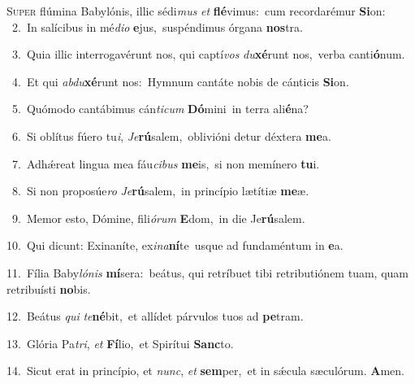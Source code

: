 \lettrine{\initial\textcolor{\initialcolor}{S}}{uper} flúmina Babylónis, illic sédi\textit{mus} \textit{et} \textbf{flé}\-vimus:~\star cum recordarémur \textbf{Si}\-on:\\
{\numbfont\textcolor{\numbcolor}{~2.}}~In salícibus in mé\-\textit{di}\-\textit{o} \textbf{e}\-jus,~\star suspéndimus órgana \textbf{nos}\-tra.\par
{\numbfont\textcolor{\numbcolor}{~3.}}~Quia illic interrogavérunt nos, qui captí\textit{vos} \textit{du}\-\textbf{xé}runt nos,~\star verba canti\-\textbf{ó}\-num.\par
{\numbfont\textcolor{\numbcolor}{~4.}}~Et qui \textit{ab}\-\textit{du}\textbf{xé}runt nos:~\star Hymnum cantáte nobis de cánticis \textbf{Si}\-on.\par
{\numbfont\textcolor{\numbcolor}{~5.}}~Quómodo cantábimus cán\-\textit{ti}\-\textit{cum} \textbf{Dó}\-mini~\star in terra ali\-\textbf{é}\-na?\par
{\numbfont\textcolor{\numbcolor}{~6.}}~Si oblítus fúero tu\-\textit{i}\-, \textit{Je}\-\textbf{rú}salem,~\star oblivióni detur déxtera \textbf{me}\-a.\par
{\numbfont\textcolor{\numbcolor}{~7.}}~Adhǽreat lingua mea fáu\-\textit{ci}\-\textit{bus} \textbf{me}\-is,~\star si non memínero \textbf{tu}\-i.\par
{\numbfont\textcolor{\numbcolor}{~8.}}~Si non proposúe\textit{ro} \textit{Je}\-\textbf{rú}salem,~\star in princípio lætítiæ \textbf{me}\-æ.\par
{\numbfont\textcolor{\numbcolor}{~9.}}~Memor esto, Dómine, fili\-\textit{ó}\-\textit{rum} \textbf{E}\-dom,~\star in die Je\-\textbf{rú}\-salem.\par
{\numbfont\textcolor{\numbcolor}{10.}}~Qui dicunt: Exinaníte, ex\-\textit{i}\-\textit{na}\textbf{ní}te~\star usque ad fundaméntum in \textbf{e}\-a.\par
{\numbfont\textcolor{\numbcolor}{11.}}~Fília Baby\-\textit{ló}\-\textit{nis} \textbf{mí}\-sera:~\star beátus, qui retríbuet tibi retributiónem tuam, quam retribuísti \textbf{no}\-bis.\par
{\numbfont\textcolor{\numbcolor}{12.}}~Beátus \textit{qui} \textit{te}\-\textbf{né}bit,~\star et allídet párvulos tuos ad \textbf{pe}\-tram.\par
{\numbfont\textcolor{\numbcolor}{13.}}~Glória Pa\-\textit{tri}\-, \textit{et} \textbf{Fí}\-lio,~\star et Spirítui \textbf{Sanc}\-to.\par
{\numbfont\textcolor{\numbcolor}{14.}}~Sicut erat in princípio, et \textit{nunc}\-, \textit{et} \textbf{sem}\-per,~\star et in sǽcula sæculórum. \textbf{A}\-men.\par
